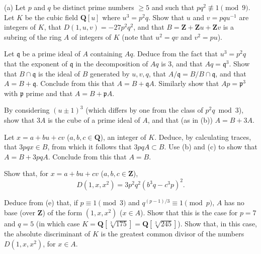  (a) Let $p$ and $q$ be distinct prime numbers $\geq5$ and such
that $pq^{2}\not\equiv1\pmod9$. Let $K$ be the cubic field $\mathbf{Q}[u]$
where $u^{3}=p^{2}q$. Show that $u$ and $v=pqu^{-1}$ are integers of $K$,
that $D(1,u,v)=-27p^{2}q^{2}$, and that
$B=\mathbf{Z}+\mathbf{Z}u+\mathbf{Z}v$ is a subring of the ring $A$ of
integers of $K$ (note that $u^{2}=qv$ and $v^{2}=pu$).
\begin{alist}
\item Let $\mathfrak{q}$ be a prime ideal of $A$ containing $Aq$. Deduce
from the fact that $u^{3}=p^{2}q$ that the exponent of $\mathfrak{q}$ in the
decomposition of $Aq$ is $3$, and that $Aq=\mathfrak{q}^{3}$. Show that
$B\cap\mathfrak{q}$ is the ideal of $B$ generated by
$u,v,q$, that $A/\mathfrak{q}=B/B\cap\mathfrak{q}$, and that
$A=B+\mathfrak{q}$. Conclude from this that $A=B+\mathfrak{q}A$. Similarly
show that $Ap=\mathfrak{p}^{3}$ with $\mathfrak{p}$ prime and that
$A=B+\mathfrak{p}A$.
\item By considering $(u\pm1)^{3}$ (which differs by one from the class of
$p^{2}q\bmod3$), show that $3A$ is the cube of a prime ideal of $A$, and
that (as in (b)) $A=B+3A$.
\item Let $x=a+bu+cv$ ($a,b,c\in\mathbf{Q}$), an integer of $K$. Deduce, by
calculating traces, that $3pqx\in B$, from which it follows that
$3pqA\subset B$. Use (b) and (c) to show that $A=B+3pqA$. Conclude from
this that $A=B$.
\item Show that, for $x=a+bu+cv$ ($a,b,c\in\mathbf{Z}$),
\[
D(1,x,x^{2})=3p^{2}q^{2}\left(b^{3}q-c^{3}p\right)^{2}.
\]
\item Deduce from (e) that, if $p\equiv1\pmod3$ and
$q^{(p-1)/3}\equiv1\pmod p$, $A$ has no base (over $\mathbf{Z}$) of the form
$(1,x,x^{2})$ ($x\in A$). Show that this is the case for $p=7$ and $q=5$
(in which case $K=\mathbf{Q}[\sqrt[3]{175}]=\mathbf{Q}[\sqrt[3]{245}]$).
Show that, in this case, the absolute discriminant of $K$ is the greatest
common divisor of the numbers $D(1,x,x^{2})$, for $x\in A$.
\end{alist}



